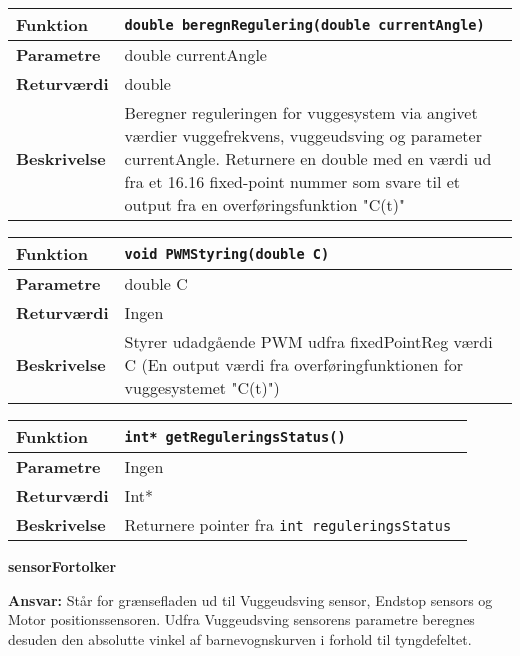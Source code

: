 \begin{center}
    \begin{tabular}{ | l | p{} |}
    \hline
    \textbf{Funktion}	& \verb+double beregnRegulering(double currentAngle) +								\\ \hline
    \textbf{Parametre} 	& double currentAngle					\\ \hline
    \textbf{Returværdi}	& double													\\ \hline
    \textbf{Beskrivelse}	& Beregner reguleringen for vuggesystem via angivet værdier vuggefrekvens, vuggeudsving og parameter currentAngle. Returnere en double med en værdi ud fra et 16.16 fixed-point nummer som svare til et output fra en overføringsfunktion "C(t)"	\\ \hline
    \end{tabular}
\end{center}

\begin{center}
    \begin{tabular}{ | l | p{} |}
    \hline
    \textbf{Funktion}	& \verb+void PWMStyring(double C) +				\\ \hline
    \textbf{Parametre} 	& double C 		\\ \hline
    \textbf{Returværdi}	& Ingen														\\ \hline
    \textbf{Beskrivelse}	& Styrer udadgående PWM udfra fixedPointReg værdi C (En output værdi fra overføringfunktionen for vuggesystemet "C(t)")	\\ \hline
    \end{tabular}
\end{center}


\begin{center}
    \begin{tabular}{ | l | p{} |}
    \hline
    \textbf{Funktion}	& \verb+int* getReguleringsStatus() +				\\ \hline
    \textbf{Parametre} 	& Ingen 		\\ \hline
    \textbf{Returværdi}	& Int*														\\ \hline
    \textbf{Beskrivelse}	& Returnere pointer fra \verb+int reguleringsStatus + 	\\ \hline
    \end{tabular}
\end{center}

{\centering
\textbf{sensorFortolker}\par
}
\textbf{Ansvar:} Står for grænsefladen ud til Vuggeudsving sensor, Endstop sensors og Motor positionssensoren. Udfra Vuggeudsving sensorens parametre beregnes desuden den absolutte vinkel af barnevognskurven i forhold til tyngdefeltet. \

